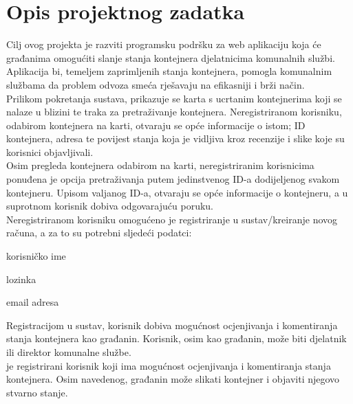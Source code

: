 \chapter{Opis projektnog zadatka}

		Cilj ovog projekta je razviti programsku podršku za web aplikaciju koja će građanima omogućiti slanje stanja kontejnera djelatnicima komunalnih službi. Aplikacija bi, temeljem zaprimljenih stanja kontejnera, pomogla komunalnim službama da problem odvoza smeća rješavaju na efikasniji i brži način.\\
		
		Prilikom pokretanja sustava, prikazuje se karta s ucrtanim kontejnerima koji se nalaze u blizini te traka za pretraživanje kontejnera.
        Neregistriranom korisniku, odabirom kontejnera na karti, otvaraju se opće informacije o istom; ID kontejnera, adresa te povijest stanja
        koja je vidljiva kroz recenzije i slike koje su korisnici objavljivali.\\

        Osim pregleda kontejnera odabirom na karti, neregistriranim korisnicima ponuđena je opcija pretraživanja
        putem jedinstvenog ID-a dodijeljenog svakom kontejneru. Upisom valjanog ID-a, otvaraju se opće informacije o kontejneru, a u suprotnom korisnik dobiva odgovarajuću
        poruku.\\
        
        Neregistriranom korisniku omogućeno je registriranje u sustav/kreiranje novog računa, a
        za to su potrebni sljedeći podatci:
        \begin{packed_item}
			
			\item  korisničko ime
			\item  lozinka
			\item  email adresa
			
		\end{packed_item}
		
		Registracijom u sustav, korisnik dobiva mogućnost ocjenjivanja i komentiranja stanja kontejnera kao građanin. Korisnik, osim kao građanin, može biti djelatnik ili direktor komunalne službe.\\
		
		 je registrirani korisnik koji ima mogućnost ocjenjivanja i komentiranja stanja kontejnera. Osim navedenog, građanin može slikati kontejner i objaviti njegovo stvarno stanje.\\
		
		
		\eject
	